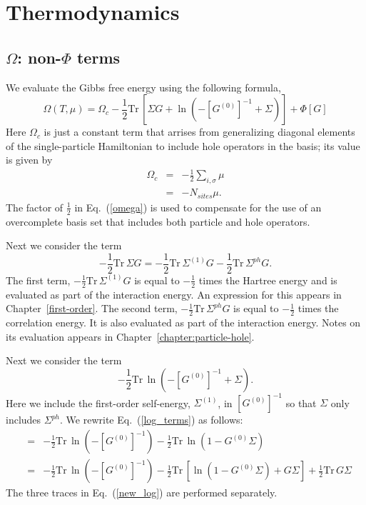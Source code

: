 \chapter{Thermodynamics}
\label{chapter:thermodynamics}

\section{$\Omega$: non-$\Phi$ terms}
We evaluate the Gibbs free energy using the following formula,
\begin{equation}
\label{omega}
\Omega(T,\mu) = \Omega_c -\frac{1}{2} \mathrm{Tr}\,\left[\Sigma G +
 \ln(-[G^{(0)}]^{-1}  + \Sigma)\right]     +
\Phi[G]
\end{equation}
Here $\Omega_c$ is just a constant term that arrises 
from generalizing diagonal elements of
the single-particle Hamiltonian to include hole operators
in the basis; its value is given by
\begin{eqnarray}
\Omega_c & = & - \frac{1}{2} \sum_{i,\sigma} \mu \\
         & = & - N_{sites} \mu.
\end{eqnarray}
The factor of $\frac{1}{2}$ in Eq.~(\ref{omega}) is used
to compensate for the use of an overcomplete basis set that
includes both particle and hole operators.

Next we consider the term
\begin{equation}
-\frac{1}{2} \mathrm{Tr} \,\Sigma G = 
-\frac{1}{2}\mathrm{Tr}\, \Sigma^{(1)}G 
-\frac{1}{2} \mathrm{Tr} \,\Sigma^{ph}G.
\end{equation}
The first term, $-\frac{1}{2}\mathrm{Tr}\, \Sigma^{(1)}G$ is equal
to $-\frac{1}{2}$ times the Hartree energy and is evaluated as
part of the interaction energy.  An expression for this
appears in Chapter~\ref{first-order}.
The second term, $-\frac{1}{2}\mathrm{Tr}\, \Sigma^{ph}G$ is
equal to $-\frac{1}{2}$ times the correlation energy.
It is also evaluated as part of the interaction energy.
Notes on its evaluation appears in Chapter~\ref{chapter:particle-hole}.

Next we consider the term
\begin{equation}
\label{log_terms}
 -\frac{1}{2}\mathrm{Tr}\,
 \ln(-[G^{(0)}]^{-1}  + \Sigma).
\end{equation}
Here we include the first-order self-energy, $\Sigma^{(1)}$,
in $[G^{(0)}]^{-1}$ so that $\Sigma$ only includes
$\Sigma^{ph}$.  We rewrite Eq.~(\ref{log_terms}) as follows:
\begin{eqnarray}
& = & -\frac{1}{2}\mathrm{Tr} \, \ln(-[G^{(0)}]^{-1})
  - \frac{1}{2}\mathrm{Tr}\,\ln(1 - G^{(0)} \Sigma) \\
\label{new_log}
& = & -\frac{1}{2}\mathrm{Tr} \, \ln(-[G^{(0)}]^{-1})
  - \frac{1}{2}\mathrm{Tr}\,\left[\ln(1 - G^{(0)} \Sigma) + G \Sigma\right] 
   + \frac{1}{2}\mathrm{Tr} \, G \Sigma 
\end{eqnarray}
The three traces in Eq.~(\ref{new_log}) are performed separately.

